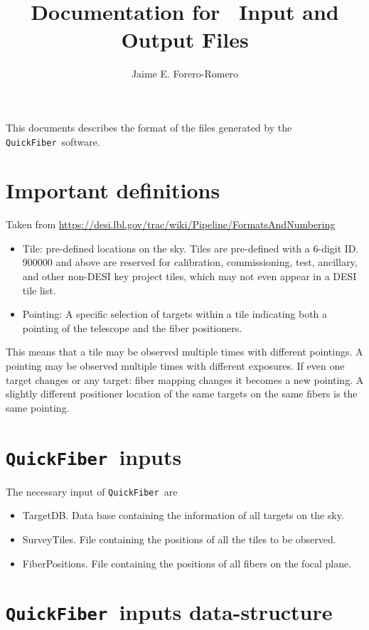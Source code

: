 \documentclass{article}
\title{Documentation for \code\ Input and Output Files}
\author{Jaime E. Forero-Romero}
\newcommand{\code}{{\texttt{QuickFiber}}}
\begin{document}
\maketitle
\tableofcontents 

\vspace{1cm}
This documents describes the format of the files generated by the
\code\ software.  

\section{Important definitions}
Taken from \url{https://desi.lbl.gov/trac/wiki/Pipeline/FormatsAndNumbering}
\begin{itemize}

  \item Tile: pre-defined locations on the sky. Tiles are pre-defined
    with a 6-digit ID. 900000 and above are reserved for calibration,
    commissioning, test, ancillary, and other non-DESI key project
    tiles, which may not even appear in a DESI tile list.  
  \item Pointing: A specific
    selection of targets within a tile indicating both a pointing of the
    telescope and the fiber positioners.  
\end{itemize}

This means that a tile may be observed
multiple times with different pointings. A pointing may be observed
multiple times with different exposures. If even one target changes
or any target: fiber mapping changes it becomes a new pointing. A
slightly different positioner location of the same targets on the
same fibers is the same pointing.  

\section{\code\ inputs}
The necessary input of \code\ are 
\begin{itemize}
\item TargetDB. Data base containing the information of all targets on the sky. 
\item SurveyTiles. File containing the positions of all the tiles to
  be observed. 
\item FiberPositions. File containing the positions of all fibers on
  the focal plane.  
\end{itemize}



\section{\code\ inputs data-structure}
\end{document}
